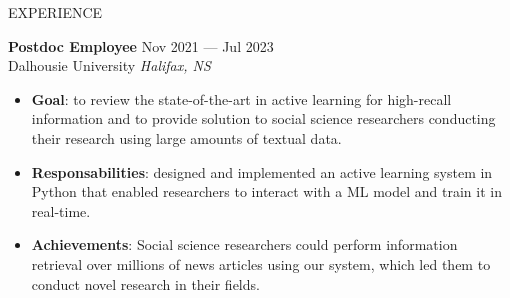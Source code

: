 \documentclass{resume} %
\begin{document}
\begin{rSection}{EXPERIENCE}




\textbf{Postdoc Employee} \hfill Nov 2021 --- Jul 2023\\
Dalhousie University \hfill \textit{Halifax, NS}\\
\vspace{-0.7cm}
\begin{itemize}
    \item \textbf{Goal}: to review the state-of-the-art in active learning for high-recall information and to provide solution to social science researchers conducting their research using large amounts of textual data.
    \vspace{-0.25cm}
    \item \textbf{Responsabilities}: designed and implemented an active learning system in Python that enabled researchers to interact with a ML model and train it in real-time.
    \vspace{-0.25cm}
    \item \textbf{Achievements}: Social science researchers could perform information retrieval over millions of news articles using our system, which led them to conduct novel research in their fields.
\end{itemize}


\end{rSection}
\end{document}
